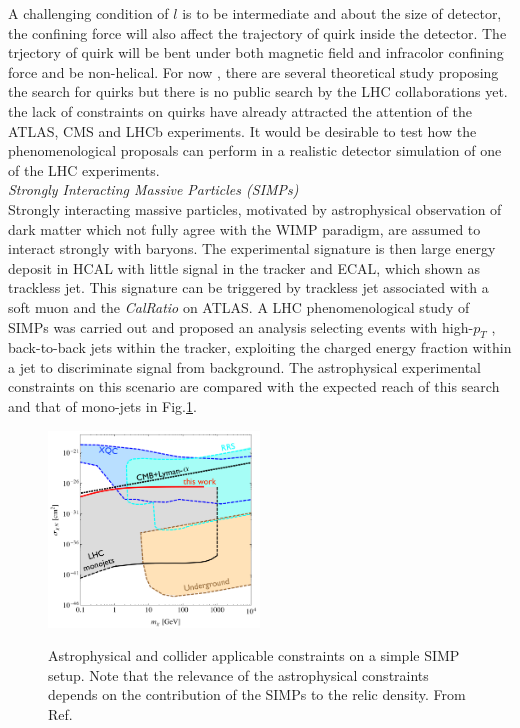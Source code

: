 A challenging condition of $l$ is to be intermediate and about the size of detector, the confining force will also affect the trajectory of quirk inside the detector. The trjectory of quirk will be bent under both magnetic field and infracolor confining force and be non-helical. For now , there are several theoretical study proposing the search for quirks but there is no public search by the LHC collaborations yet. the lack of constraints on quirks have already attracted the attention of the ATLAS, CMS and LHCb experiments. It would be desirable to test how the phenomenological proposals can perform in a realistic detector simulation of one of the LHC experiments.\\

\textit{Strongly Interacting Massive Particles (SIMPs)}
\\

Strongly interacting massive particles, motivated by astrophysical observation of dark matter which not fully agree with the WIMP paradigm, are assumed to interact strongly with baryons. The experimental signature is then large energy deposit in HCAL with little signal in the tracker and ECAL, which shown as trackless jet. This signature can be triggered by trackless jet associated with a soft muon and the \textit{CalRatio} on ATLAS. A LHC phenomenological study of SIMPs was carried out and proposed an analysis selecting events with high-$p_T$ , back-to-back jets within the tracker, exploiting the charged energy fraction within a jet to discriminate signal from background. The astrophysical experimental constraints on this scenario are compared with the expected reach of this search and that of mono-jets in Fig.\ref{fig:SIMP}.

\begin{figure}
    \centering
    \caption{Astrophysical and collider applicable constraints on a simple SIMP setup. Note that the relevance of the astrophysical constraints depends on the contribution of the SIMPs to the relic density. From Ref.\cite{SimpleSIMP}}
    \includegraphics[width=0.5\textwidth]{fig/SIMP.png}
    \label{fig:SIMP}
\end{figure}


